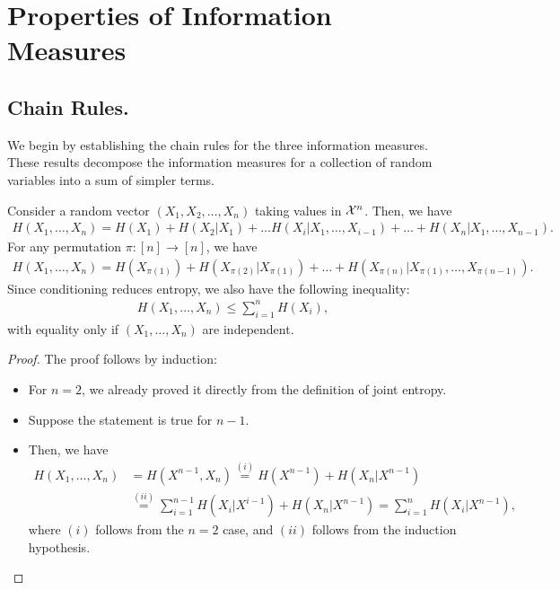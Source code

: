         \section{Properties of Information Measures}

            \subsection{Chain Rules.} We begin by establishing the chain rules for the three information measures. These results decompose the information measures for a collection of random variables into a sum of simpler terms. 
            
            \begin{theorem}
                \label{thm:chain-rule-ent}
                Consider a random vector $(X_1, X_2, \ldots, X_n)$ taking values in $\mathcal{X}^n$. Then, we have 
                \begin{align}
                    H(X_1, \ldots, X_n) = H(X_1) + H(X_2|X_1) + \ldots H(X_i|X_1, \ldots, X_{i-1}) + \ldots + H(X_n|X_1, \ldots, X_{n-1}). 
                \end{align}
                For any permutation $\pi:[n] \to [n]$, we have  
                \begin{align}
                    H(X_1, \ldots, X_n) = H(X_{\pi(1)}) + H(X_{\pi(2)}|X_{\pi(1)}) + \ldots + H(X_{\pi(n)}|X_{\pi(1)}, \ldots, X_{\pi(n-1)}). 
                \end{align}
                Since conditioning reduces entropy, we also have the following inequality: 
                \begin{align}
                H(X_1, \ldots, X_n) \leq \sum_{i=1}^n H(X_i), 
                \end{align}
                with equality only if $(X_1, \ldots, X_n)$ are independent. 
            \end{theorem}

            \begin{proof}
                The proof follows by induction: 
                \begin{itemize}
                    \item For $n=2$, we already proved it directly from the definition of joint entropy. 
                    \item Suppose the statement is true for $n-1$. 
                    \item Then, we have 
                    \begin{align}
                        H(X_1, \ldots, X_n) &= H(X^{n-1}, X_n)  \stackrel{(i)}{=}H(X^{n-1}) + H(X_n|X^{n-1}) \\
                        &\stackrel{(ii)}{=} \sum_{i=1}^{n-1} H(X_i|X^{i-1}) + H(X_n|X^{n-1}) = \sum_{i=1}^n H(X_i|X^{n-1}), 
                    \end{align}
                    where $(i)$ follows from the $n=2$ case, and $(ii)$ follows from the induction hypothesis. 
                \end{itemize}
            \end{proof}


